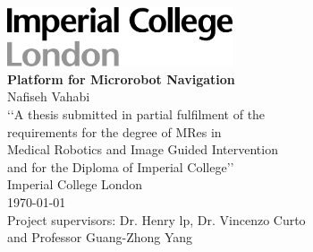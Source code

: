\documentclass[12pt,a4paper,titlepage]{report}
\begin{document}

\begin{titlepage}
\vspace*{\fill} %
\begin{center}




\includegraphics[width=0.5\textwidth]{logo.jpg}\\[1.4cm] 




\textbf{\LARGE Platform for Microrobot Navigation} \\ [1.5cm]


{\LARGE Nafiseh Vahabi} \\ [1.3cm]


{\LARGE \lq{}\lq{}A thesis submitted in partial fulfilment of the } \\ [0.3cm]
{\LARGE requirements for the degree of MRes in }\\ [0.3cm]
{\LARGE  Medical Robotics and Image Guided Intervention}\\ [0.3cm]
{\LARGE  and for the Diploma of Imperial College\rq{}\rq{}}\\ [1.3cm]


{\LARGE Imperial College London} \\ [0.8cm]

{\LARGE \today} \\ [1.5cm]

{\LARGE Project supervisors: Dr. Henry lp, Dr. Vincenzo Curto} \\ [0.3cm]
{\LARGE and  Professor Guang-Zhong Yang} \\ [1cm]




\end{center}
\vspace*{\fill}
\end{titlepage}
\end{document}
